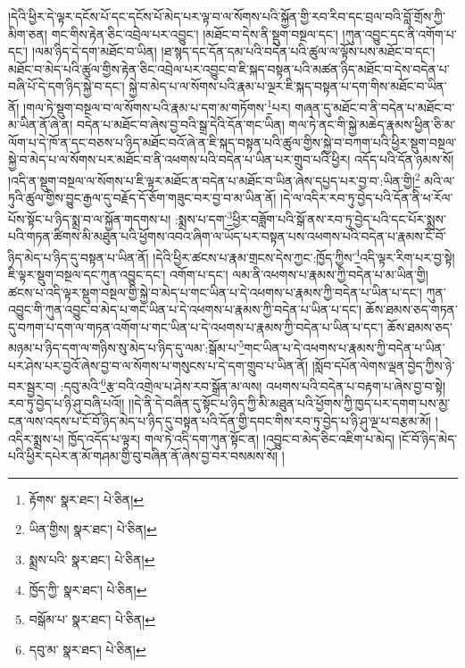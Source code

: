 །དེའི་ཕྱིར་དེ་ལྟར་དངོས་པོ་དང་དངོས་པོ་མེད་པར་ལྟ་བ་ལ་སོགས་པའི་སྐྱོན་གྱི་རབ་རིབ་དང་བྲལ་བའི་བློ་གྲོས་ཀྱི་མིག་ཅན། གང་གིས་རྟེན་ཅིང་འབྲེལ་པར་འབྱུང་། །མཐོང་བ་དེས་ནི་སྡུག་བསྔལ་དང་། །ཀུན་འབྱུང་དང་ནི་འགོག་པ་དང་། །ལམ་ཉིད་དེ་དག་མཐོང་བ་ཡིན། །ཐ་སྙད་དང་དོན་དམ་པའི་བདེན་པའི་ཚུལ་ལ་ལྟོས་པས་མཐོང་བ་དང་། མཐོང་བ་མེད་པའི་ཚུལ་གྱིས་རྟེན་ཅིང་འབྲེལ་པར་འབྱུང་བ་ཇི་སྐད་བསྟན་པའི་མཚན་ཉིད་མཐོང་བ་དེས་བདེན་པ་བཞི་པོ་དེ་དག་ཉིད་སྐྱེ་བ་དང་། སྐྱེ་བ་མེད་པ་ལ་སོགས་པའི་རྣམ་པ་ལྔར་ཇི་སྐད་བསྟན་པ་དག་གིས་མཐོང་བ་ཡིན་ནོ། །གལ་ཏེ་སྡུག་བསྔལ་བ་ལ་སོགས་པའི་རྣམ་པ་དག་མ་གཏོགས་\footnote{རྟོགས་  སྣར་ཐང་།  པེ་ཅིན། }པར། གཞན་དུ་མཐོང་བ་ནི་བདེན་པ་མཐོང་བ་མ་ཡིན་ནོ་ཞེ་ན། བདེན་པ་མཐོང་བ་ཞེས་བྱ་བའི་སྒྲ་དེའི་དོན་གང་ཡིན། གལ་ཏེ་ནང་གི་སྐྱེ་མཆེད་རྣམས་ཕྱིན་ཅི་མ་ལོག་པ་དེ་ཁོ་ན་དང་བཅས་པ་ཉིད་མཐོང་བའོ་ཞེ་ན་ཇི་སྐད་བསྟན་པའི་ཚུལ་གྱིས་སྐྱེ་བ་བཀག་པའི་ཕྱིར་སྡུག་བསྔལ་སྐྱེ་བ་མེད་པ་ལ་སོགས་པར་མཐོང་བ་ནི་འཕགས་པའི་བདེན་པ་ཡིན་པར་གྲུབ་པའི་ཕྱིར། འདོད་པའི་དོན་ཉམས་སོ། །འདི་ན་སྡུག་བསྔལ་ལ་སོགས་པ་ཇི་ལྟར་མཐོང་ན་བདེན་པ་མཐོང་བ་ཡིན་ཞེས་དཔྱད་པར་བྱ་བ་:ཡིན་གྱི།\footnote{ཡིན་གྱིས།  སྣར་ཐང་།  པེ་ཅིན། } མའི་ལ་ཏུའི་ཚུལ་གྱིས་བྱུང་རྒྱལ་དུ་བརྗོད་དོ་ཅོག་གཟུང་བར་བྱ་བ་མ་ཡིན་ནོ། །དེ་ལ་འདིར་རབ་ཏུ་བྱེད་པའི་དོན་ནི་ཕ་རོལ་པོས་སྟོང་པ་ཉིད་སྨྲ་བ་ལ་སྐྱོན་གདགས་པ། :སྨྲས་པ་དག་\footnote{སྨྲས་པའི་  སྣར་ཐང་།  པེ་ཅིན། }ཕྱིར་བཟློག་པའི་སྒོ་ནས་རབ་ཏུ་བྱེད་པའི་དང་པོར་སྨྲས་པའི་གཏན་ཚིགས་མི་མཐུན་པའི་ཕྱོགས་འབའ་ཞིག་ལ་ཡོད་པར་བསྟན་པས་འཕགས་པའི་བདེན་པ་རྣམས་ངོ་བོ་ཉིད་མེད་པ་ཉིད་དུ་བསྟན་པ་ཡིན་ནོ། །དེའི་ཕྱིར་ཚངས་པ་རྣམ་གྲངས་དེས་ཀྱང་:ཁྱོད་ཀྱིས་\footnote{ཁྱོད་ཀྱི་  སྣར་ཐང་།  པེ་ཅིན། }འདི་ལྟར་རིག་པར་བྱ་སྟེ། ཇི་ལྟར་སྡུག་བསྔལ་དང་ཀུན་འབྱུང་དང་། འགོག་པ་དང་། ལམ་ནི་འཕགས་པ་རྣམས་ཀྱི་བདེན་པ་མ་ཡིན་གྱི། ཚངས་པ་འདི་ལྟར་སྡུག་བསྔལ་གྱི་སྐྱེ་བ་མེད་པ་གང་ཡིན་པ་དེ་འཕགས་པ་རྣམས་ཀྱི་བདེན་པ་ཡིན་པ་དང་། ཀུན་འབྱུང་གི་ཀུན་འབྱུང་བ་མེད་པ་གང་ཡིན་པ་དེ་འཕགས་པ་རྣམས་ཀྱི་བདེན་པ་ཡིན་པ་དང་། ཆོས་ཐམས་ཅད་གཏན་དུ་བཀག་པ་དག་ལ་གཏན་འགོག་པ་གང་ཡིན་པ་དེ་འཕགས་པ་རྣམས་ཀྱི་བདེན་པ་ཡིན་པ་དང་། ཆོས་ཐམས་ཅད་མཉམ་པ་ཉིད་དག་ལ་གཉིས་སུ་མེད་པ་ཉིད་དུ་ལམ་:སྒོམ་པ་\footnote{བསྒོམ་པ་  སྣར་ཐང་།  པེ་ཅིན། }གང་ཡིན་པ་དེ་འཕགས་པ་རྣམས་ཀྱི་བདེན་པ་ཡིན་པར་ཤེས་པར་བྱའོ་ཞེས་བྱ་བ་ལ་སོགས་པ་གསུངས་པ་དེ་དག་གྲུབ་པ་ཡིན་ནོ། །སློབ་དཔོན་ལེགས་ལྡན་བྱེད་ཀྱིས་ཉེ་བར་སྦྱར་བ། :དབུ་མའི་\footnote{དབུ་མ་  སྣར་ཐང་།  པེ་ཅིན། }རྩ་བའི་འགྲེལ་པ་ཤེས་རབ་སྒྲོན་མ་ལས། འཕགས་པའི་བདེན་པ་བརྟག་པ་ཞེས་བྱ་བ་སྟེ། རབ་ཏུ་བྱེད་པ་ཉི་ཤུ་བཞི་པའོ།། །།དེ་ནི་དེ་བཞིན་དུ་སྟོང་པ་ཉིད་ཀྱི་མི་མཐུན་པའི་ཕྱོགས་ཀྱི་ཁྱད་པར་དགག་པས་མྱ་ངན་ལས་འདས་པ་ངོ་བོ་ཉིད་མེད་པ་ཉིད་དུ་བསྟན་པའི་དོན་གྱི་དབང་གིས་རབ་ཏུ་བྱེད་པ་ཉི་ཤུ་ལྔ་པ་བརྩམ་མོ། །འདིར་སྨྲས་པ། ཁྱོད་འདོད་པ་ལྟར། གལ་ཏེ་འདི་དག་ཀུན་སྟོང་ན། །འབྱུང་བ་མེད་ཅིང་འཇིག་པ་མེད། །ངོ་བོ་ཉིད་མེད་པའི་ཕྱིར་དཔེར་ན་མོ་གཤམ་གྱི་བུ་བཞིན་ནོ་ཞེས་བྱ་བར་བསམས་སོ། །
